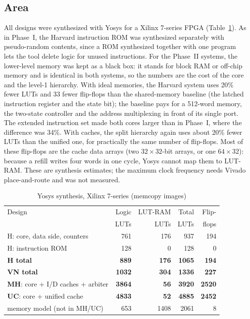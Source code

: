 \documentclass[conference]{IEEEtran}
\begin{document}
\subsection{Area}
All designs were synthesized with Yosys for a Xilinx 7-series FPGA
(Table~\ref{tab:synth}). As in Phase~I, the Harvard instruction ROM was
synthesized separately with pseudo-random contents, since a ROM synthesized
together with one program lets the tool delete logic for unused
instructions. For the Phase~II systems, the lower-level memory was kept as a
black box: it stands for block RAM or off-chip memory and is identical in
both systems, so the numbers are the cost of the core and the level-1
hierarchy. With ideal memories, the Harvard system uses 20\% fewer LUTs and
33 fewer flip-flops than the shared-memory baseline (the latched instruction
register and the state bit); the baseline pays for a 512-word memory, the
two-state controller and the address multiplexing in front of its single
port. The extended instruction set made both cores larger than in Phase~I,
where the difference was 34\%. With caches, the split hierarchy again uses
about 20\% fewer LUTs than the unified one, for practically the same number
of flip-flops. Most of these flip-flops are the cache data arrays (two
$32\times32$-bit arrays, or one $64\times32$): because a refill writes four
words in one cycle, Yosys cannot map them to LUT-RAM. These are synthesis
estimates; the maximum clock frequency needs Vivado place-and-route and was
not measured.

\begin{table}[t]
\caption{Yosys synthesis, Xilinx 7-series (memcopy images)}
\label{tab:synth}
\centering
\setlength{\tabcolsep}{3pt}
\begin{tabular}{lrrrr}
\toprule
Design & Logic & LUT-RAM & Total & Flip- \\
 & LUTs & LUTs & LUTs & flops \\
\midrule
H: core, data side, counters   &  761 & 176 &  937 &  194 \\
H: instruction ROM            &  128 &   0 &  128 &    0 \\
\textbf{H total}              & \textbf{889} & \textbf{176} & \textbf{1065} & \textbf{194} \\
\textbf{VN total}             & \textbf{1032} & \textbf{304} & \textbf{1336} & \textbf{227} \\
\midrule
\textbf{MH}: core + I/D caches + arbiter & \textbf{3864} & \textbf{56} & \textbf{3920} & \textbf{2520} \\
\textbf{UC}: core + unified cache       & \textbf{4833} & \textbf{52} & \textbf{4885} & \textbf{2452} \\
memory model (not in MH/UC)    &  653 & 1408 & 2061 &    8 \\
\bottomrule
\end{tabular}
\end{table}
\end{document}
